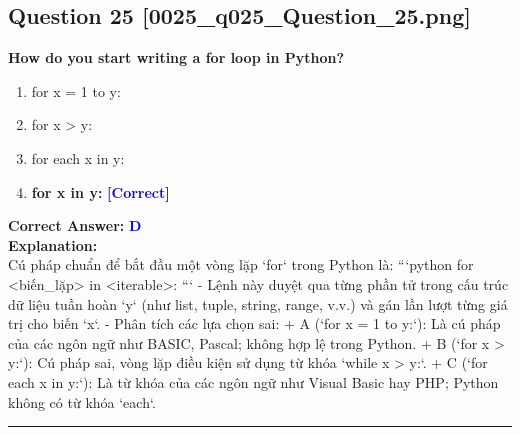 \documentclass[11pt,a4paper]{article}
\begin{document}
\begin{minipage}{\textwidth}
\subsection*{Question 25 \quad \footnotesize{[0025_q025_Question_25.png]}}
\noindent \textbf{How do you start writing a for loop in Python?}

\begin{enumerate}[label=\Alph*.]
    \item for x = 1 to y:
    \item for x > y:
    \item for each x in y:
    \item \textbf{for x in y:} \hfill \textcolor{blue}{\textbf{[Correct]}}
\end{enumerate}

\noindent \textbf{Correct Answer:} \textcolor{blue}{\textbf{D}} \\[4pt]
\noindent \textbf{Explanation:}\\
Cú pháp chuẩn để bắt đầu một vòng lặp `for` trong Python là:\newline
```python\newline
for <biến_lặp> in <iterable>:\newline
```\newline
- Lệnh này duyệt qua từng phần tử trong cấu trúc dữ liệu tuần hoàn `y` (như list, tuple, string, range, v.v.) và gán lần lượt từng giá trị cho biến `x`.\newline
- Phân tích các lựa chọn sai:\newline
  + A (`for x = 1 to y:`): Là cú pháp của các ngôn ngữ như BASIC, Pascal; không hợp lệ trong Python.\newline
  + B (`for x > y:`): Cú pháp sai, vòng lặp điều kiện sử dụng từ khóa `while x > y:`.\newline
  + C (`for each x in y:`): Là từ khóa của các ngôn ngữ như Visual Basic hay PHP; Python không có từ khóa `each`.
\end{minipage}
\vspace{0.8cm}
\hrule
\vspace{0.5cm}
\end{document}
